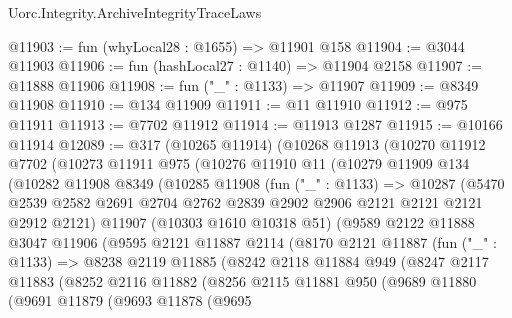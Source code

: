 \begin{lexlean}{Uorc.Integrity.ArchiveIntegrityTraceLaws}
\begin{coremodule}
@11903 := fun (whyLocal28 : @1655) => @11901 @158
@11904 := @3044 @11903
@11906 := fun (hashLocal27 : @1140) => @11904 @2158
@11907 := @11888 @11906
@11908 := fun ("_" : @1133) => @11907
@11909 := @8349 @11908
@11910 := @134 @11909
@11911 := @11 @11910
@11912 := @975 @11911
@11913 := @7702 @11912
@11914 := @11913 @1287
@11915 := @10166 @11914
@12089 := @317
    (@10265 @11914)
    (@10268
      @11913
      (@10270
        @11912
        @7702
        (@10273
          @11911
          @975
          (@10276
            @11910
            @11
            (@10279
              @11909
              @134
              (@10282
                @11908
                @8349
                (@10285
                  @11908
                  (fun ("_" : @1133) =>
                  @10287
                    (@5470
                      @2539
                      @2582
                      @2691
                      @2704
                      @2762
                      @2839
                      @2902
                      @2906
                      @2121
                      @2121
                      @2121
                      @2912
                      @2121)
                    @11907
                    (@10303 @1610 @10318 @51)
                    (@9589
                      @2122
                      @11888
                      @3047
                      @11906
                      (@9595
                        @2121
                        @11887
                        @2114
                        (@8170
                          @2121
                          @11887
                          (fun ("_" : @1133) =>
                          @8238
                            @2119
                            @11885
                            (@8242
                              @2118
                              @11884
                              @949
                              (@8247
                                @2117
                                @11883
                                (@8252
                                  @2116
                                  @11882
                                  (@8256
                                    @2115
                                    @11881
                                    @950
                                    (@9689
                                      @11880
                                      (@9691
                                        @11879
                                        (@9693
                                          @11878
                                          (@9695

\end{coremodule}
\end{lexlean}
